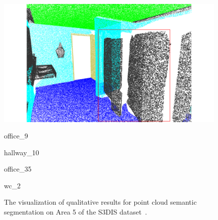 \begin{figure}[htbp]
\begin{minipage}{0.22\textwidth}
    \end{minipage}
    \hfill
    \begin{minipage}{0.22\textwidth}
        \centering
        \includegraphics[width=\textwidth]{fig/supplement/semantic_segmentation/wc_2/GT_wc_2.pdf}
    \end{minipage}
    \hfill
    
    \vspace{0.5em}
    \begin{minipage}{0.09\textwidth} %
        \color{white}{12}
    \end{minipage}
    \hfill
    \begin{minipage}{0.22\textwidth} %
        \centering
        office\_9
    \end{minipage}
    \hfill
    \begin{minipage}{0.22\textwidth} %
        \centering
        hallway\_10
    \end{minipage}
    \hfill
    \begin{minipage}{0.22\textwidth} %
        \centering
        office\_35
    \end{minipage}
    \hfill
    \begin{minipage}{0.22\textwidth} %
        \centering
        wc\_2
    \end{minipage}
    \hfill
    \caption{The visualization of qualitative results for point cloud semantic segmentation on Area 5 of the S3DIS dataset~\cite{armeni20163d}. %
    }
    \label{fig:s3dis_1}

\end{figure}
